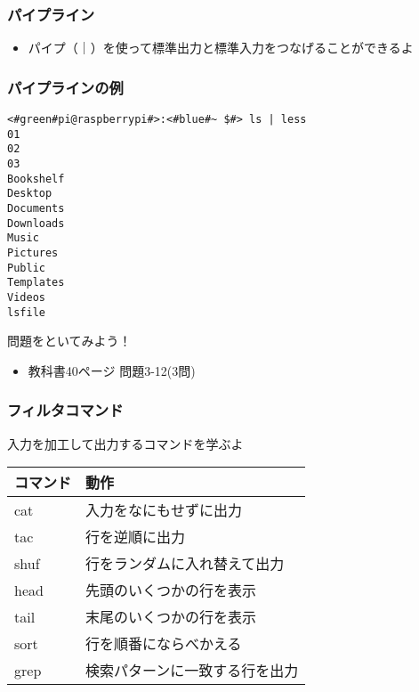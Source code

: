 \begin{frame}
    \frametitle{パイプライン}
    \begin{itemize}
        \item パイプ（｜）を使って標準出力と標準入力をつなげることができるよ
    \end{itemize}
    \begin{figure}
        \centering
        
    \end{figure}
\end{frame}

\begin{frame}[fragile]
    \frametitle{パイプラインの例}
    \begin{lstlisting}[title=lsコマンドの出力をパイプでlessコマンドに渡す, label=redirectCat]
<#green#pi@raspberrypi#>:<#blue#~ $#> ls | less
01
02
03
Bookshelf
Desktop
Documents
Downloads
Music
Pictures
Public
Templates
Videos
lsfile
    \end{lstlisting}
\end{frame}

\begin{frame}
    \begin{exampleblock}{問題をといてみよう！}
        \begin{itemize}
            \item 教科書40ページ 問題3-12(3問)
        \end{itemize}
    \end{exampleblock} 
\end{frame}

\begin{frame}
    \frametitle{フィルタコマンド}
    入力を加工して出力するコマンドを学ぶよ\\
    \vspace{\zh}
    \begin{tabular}{ll}
        コマンド & 動作                               \\ \hline
        cat      & 入力をなにもせずに出力         \\
        tac      & 行を逆順に出力                 \\
        shuf     & 行をランダムに入れ替えて出力   \\
        head     & 先頭のいくつかの行を表示       \\
        tail     & 末尾のいくつかの行を表示       \\
        sort     & 行を順番にならべかえる         \\
        grep     & 検索パターンに一致する行を出力 \\ \hline
    \end{tabular}
\end{frame}

